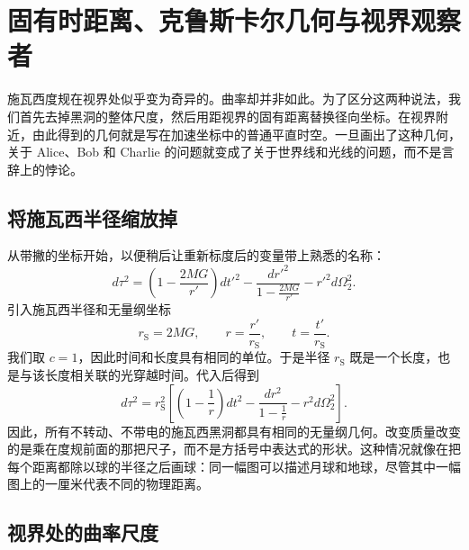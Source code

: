 \chapter{固有时距离、克鲁斯卡尔几何与视界观察者}

施瓦西度规在视界处似乎变为奇异的。曲率却并非如此。为了区分这两种说法，我们首先去掉黑洞的整体尺度，然后用距视界的固有距离替换径向坐标。在视界附近，由此得到的几何就是写在加速坐标中的普通平直时空。一旦画出了这种几何，关于 Alice、Bob 和 Charlie 的问题就变成了关于世界线和光线的问题，而不是言辞上的悖论。

\section{将施瓦西半径缩放掉}

从带撇的坐标开始，以便稍后让重新标度后的变量带上熟悉的名称：
\begin{equation}
d\tau^2
=
\left(1-\frac{2MG}{r'}\right)dt'^2
-
\frac{dr'^2}{1-\frac{2MG}{r'}}
-
r'^2d\Omega_2^2.
\label{eq:l7-schwarzschild-dimensional}
\end{equation}
引入施瓦西半径和无量纲坐标
\begin{equation}
r_{\mathrm S}=2MG,
\qquad
r=\frac{r'}{r_{\mathrm S}},
\qquad
t=\frac{t'}{r_{\mathrm S}}.
\label{eq:l7-rescaling}
\end{equation}
我们取 \(c=1\)，因此时间和长度具有相同的单位。于是半径 \(r_{\mathrm S}\) 既是一个长度，也是与该长度相关联的光穿越时间。代入后得到
\begin{equation}
d\tau^2
=r_{\mathrm S}^2
\left[
\left(1-\frac1r\right)dt^2
-
\frac{dr^2}{1-\frac1r}
-
r^2d\Omega_2^2
\right].
\label{eq:l7-schwarzschild-rescaled}
\end{equation}
因此，所有不转动、不带电的施瓦西黑洞都具有相同的无量纲几何。改变质量改变的是乘在度规前面的那把尺子，而不是方括号中表达式的形状。这种情况就像在把每个距离都除以球的半径之后画球：同一幅图可以描述月球和地球，尽管其中一幅图上的一厘米代表不同的物理距离。

\begin{classroomqa}
\end{classroomqa}

\section{视界处的曲率尺度}

